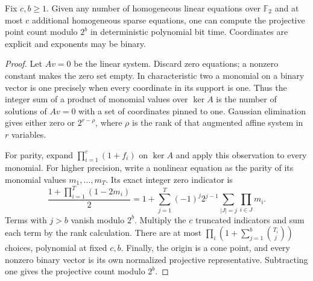 \begin{theorem}
\label{sp:thm:binary}
Fix $c,b\geq1$. Given any number of homogeneous linear equations over
$\mathbb F_2$ and at most $c$ additional homogeneous sparse equations,
one can compute the projective point count modulo $2^b$ in deterministic
polynomial bit time. Coordinates are explicit and exponents may be
binary.
\end{theorem}
\begin{proof}
Let $Av=0$ be the linear system. Discard zero equations; a nonzero
constant makes the zero set empty. In characteristic two a monomial
on a binary vector is one precisely when every coordinate in its
support is one. Thus the integer sum of a product of monomial values
over $\ker A$ is the number of solutions of $Av=0$ with a set of
coordinates pinned to one. Gaussian elimination gives either zero or
$2^{r-\rho}$, where $\rho$ is the rank of that augmented affine system
in $r$ variables.

For parity, expand $\prod_{i=1}^c(1+f_i)$ on $\ker A$ and apply this
observation to every monomial. For higher precision, write a nonlinear
equation as the parity of its monomial values $m_1,\ldots,m_T$.
Its exact integer zero indicator is
\[
 \frac{1+\prod_{i=1}^T(1-2m_i)}2
 =1+\sum_{j=1}^T(-1)^j2^{j-1}
             \sum_{|J|=j}\prod_{i\in J}m_i.
\]
Terms with $j>b$ vanish modulo $2^b$. Multiply the $c$ truncated
indicators and sum each term by the rank calculation. There are at
most $\prod_i(1+\sum_{j=1}^b\binom{T_i}{j})$ choices, polynomial at
fixed $c,b$. Finally, the origin is a cone point, and every nonzero
binary vector is its own normalized projective representative.
Subtracting one gives the projective count modulo $2^b$.
\end{proof}

